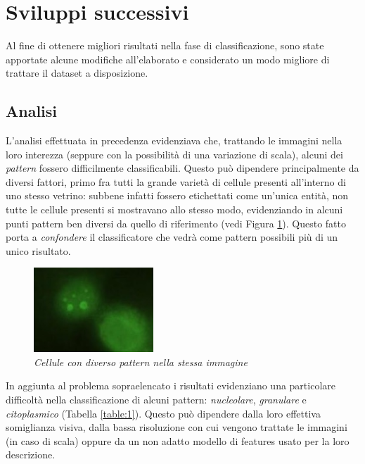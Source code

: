 \section{Sviluppi successivi}

Al fine di ottenere migliori risultati nella fase di classificazione, sono state apportate alcune modifiche all'elaborato e considerato un modo migliore di trattare il dataset a disposizione.

\subsection{Analisi}

L'analisi effettuata in precedenza evidenziava che, trattando le immagini nella loro interezza (seppure con la possibilità di una variazione di scala), alcuni dei \emph{pattern} fossero difficilmente classificabili.
Questo può dipendere principalmente da diversi fattori, primo fra tutti la grande varietà di cellule presenti all'interno di uno stesso vetrino: subbene infatti fossero etichettati come un'unica entità, non tutte le cellule presenti si mostravano allo stesso modo, evidenziando in alcuni punti pattern ben diversi da quello di riferimento (vedi Figura \ref{fig:errors}). Questo fatto porta a \emph{confondere} il classificatore che vedrà come pattern possibili più di un unico risultato.

\begin{figure}[H] 
  \centering
    \includegraphics[width=0.4\textwidth]{images/errori.jpg}
    \caption{{\small \textit{Cellule con diverso pattern nella stessa immagine}}}
   \label{fig:errors}
\end{figure}

In aggiunta al problema sopraelencato i risultati evidenziano una particolare difficoltà nella classificazione di alcuni pattern: \emph{nucleolare}, \emph{granulare} e \emph{citoplasmico} (Tabella \ref{table:1}). Questo può dipendere dalla loro effettiva somiglianza visiva, dalla bassa risoluzione con cui vengono trattate le immagini (in caso di scala) oppure da un non adatto modello di features usato per la loro descrizione.

